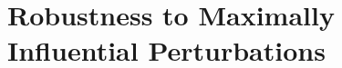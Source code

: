 \documentclass[12pt]{article}
\begin{document}


\section{Robustness to Maximally Influential Perturbations}\label{appendix_broderick}
\setcounter{table}{0}
\setcounter{figure}{0}
\renewcommand{\thetable}{N\arabic{table}}
\renewcommand{\thefigure}{N\arabic{figure}}
\normalsize
\end{document}
